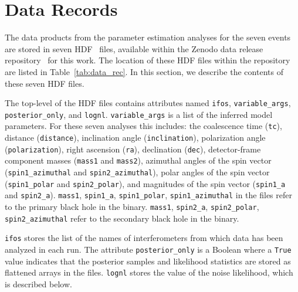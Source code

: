 \section{Data Records}\label{sec:data_record}

The data products from the parameter estimation analyses for the seven events are stored in seven HDF~\cite{andrew_collette_2018_1246321} files, available within the Zenodo data release repository~\cite{data_release} for this work. The location of these HDF files within the repository are listed in Table~\ref{tab:data_rec}. In this section, we describe the contents of these seven HDF files.

The top-level of the HDF files contains attributes named \texttt{ifos}, \texttt{variable\_args}, \texttt{posterior\_only}, and \texttt{lognl}. \texttt{variable\_args} is a list of the inferred model parameters.
For these seven analyses this includes: the coalescence time (\texttt{tc}), distance (\texttt{distance}), inclination angle (\texttt{inclination}), polarization angle (\texttt{polarization}), right ascension (\texttt{ra}), declination (\texttt{dec}), detector-frame component masses (\texttt{mass1} and \texttt{mass2}), azimuthal angles of the spin vector (\texttt{spin1\_azimuthal} and \texttt{spin2\_azimuthal}), polar angles of the spin vector (\texttt{spin1\_polar} and \texttt{spin2\_polar}), and magnitudes of the spin vector (\texttt{spin1\_a} and \texttt{spin2\_a}). \texttt{mass1}, \texttt{spin1\_a}, \texttt{spin1\_polar}, \texttt{spin1\_azimuthal} in the files refer to the primary black hole in the binary. \texttt{mass1}, \texttt{spin2\_a}, \texttt{spin2\_polar}, \texttt{spin2\_azimuthal} refer to the secondary black hole in the binary. 

\texttt{ifos} stores the list of the names of interferometers from which data has been analyzed in each run. The attribute \texttt{posterior\_only} is a Boolean where a \texttt{True} value indicates that the posterior samples and likelihood statistics are stored as flattened arrays in the files. \texttt{lognl} stores the value of the noise likelihood, which is described below.    

